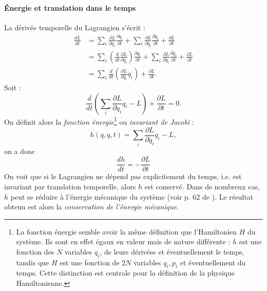 \paragraph*{\'{E}nergie et translation dans le temps}
La dérivée temporelle du Lagrangien s'écrit : 
\begin{align*}
\frac{dL}{dt}&=\sum_i\frac{\partial L}{\partial q_i}\frac{\partial q_i}{\partial t}+\sum_i\frac{\partial L}{\partial \dot{q}_i}\frac{\partial \dot{q}_i}{\partial t}+\frac{\partial L}{\partial t}\\
&= \sum_i\left(\frac{d}{dt}\frac{\partial L}{\partial \dot{q}_i}\right)\frac{\partial q_i}{\partial t}+\sum_i\frac{\partial L}{\partial \dot{q}_i}\frac{\partial \dot{q}_i}{\partial t}+\frac{\partial L}{\partial t}\\
&= \sum_i\frac{d}{dt}\left(\frac{\partial L}{\partial \dot{q}_i}\dot{q}_i\right)+\frac{\partial L}{\partial t}.
\end{align*}
Soit :
\begin{equation*}
\frac{d}{dt}\left(\sum_i\frac{\partial L}{\partial \dot{q}_i}\dot{q}_i-L\right)+\frac{\partial L}{\partial t}=0.
\end{equation*}
On définit alors la \textit{fonction énergie}\footnote{La fonction énergie semble avoir la même définition que l'Hamiltonien $H$ du système. Ils sont en effet égaux en valeur mais de nature différente : $h$ est une fonction des $N$ variables ${q_i}$, de leurs dérivées et éventuellement le temps, tandis que $H$ est une fonction de $2N$ variables ${q_i,p_i}$ et éventuellement du temps. Cette distinction est centrale pour la définition de la physique Hamiltonienne.} ou \textit{invariant de Jacobi} :
\begin{equation*}
h(q,\dot{q},t) = \sum_i\frac{\partial L}{\partial \dot{q}_i}\dot{q}_i-L,
\end{equation*}
on a donc 
\begin{equation*}
\frac{dh}{dt} = -\frac{\partial L}{\partial t}
\end{equation*}
On voit que si le Lagrangien ne dépend pas explicitement du temps, i.e. est invariant par translation temporelle, alors $h$ est conservé. Dans de nombreux cas, $h$ peut se réduire à l'énergie mécanique du système (voir p. 62 de ). Le résultat obtenu est alors la \textit{conservation de l'énergie mécanique}. 


